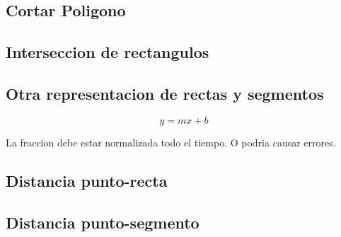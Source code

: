 \subsection{Cortar Poligono}

\subsection{Interseccion de rectangulos}

\subsection{Otra representacion de rectas y segmentos}
$$y = mx + b$$

La fraccion debe estar normalizada todo el tiempo. O podria causar errores.

\subsection{Distancia punto-recta}


\subsection{Distancia punto-segmento}


